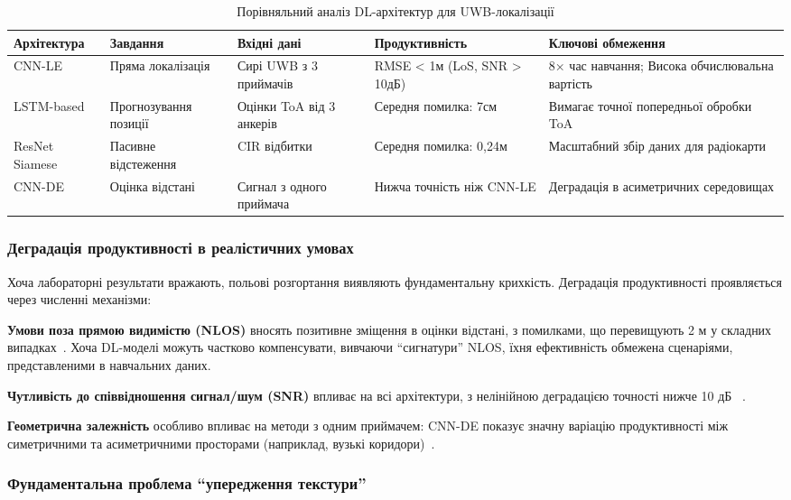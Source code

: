 \documentclass[12pt,a4paper]{article}
\begin{document}
\begin{table}[h]
	\centering
	\caption{Порівняльний аналіз DL-архітектур для UWB-локалізації}
	\label{tab:dl_architectures}
	\begin{tabular}{@{}p{2.5cm}p{2.5cm}p{3cm}p{3cm}p{3.5cm}@{}}
		\toprule
		\textbf{Архітектура} & \textbf{Завдання} & \textbf{Вхідні дані} & \textbf{Продуктивність} & \textbf{Ключові обмеження} \\
		\midrule
		CNN-LE & Пряма локалізація & Сирі UWB з 3 приймачів & RMSE < 1м (LoS, SNR > 10дБ) & 8× час навчання; Висока обчислювальна вартість \\
		LSTM-based & Прогнозування позиції & Оцінки ToA від 3 анкерів & Середня помилка: 7см & Вимагає точної попередньої обробки ToA \\
		ResNet Siamese & Пасивне відстеження & CIR відбитки & Середня помилка: 0,24м & Масштабний збір даних для радіокарти \\
		CNN-DE & Оцінка відстані & Сигнал з одного приймача & Нижча точність ніж CNN-LE & Деградація в асиметричних середовищах \\
		\bottomrule
	\end{tabular}
\end{table}

\subsubsection{Деградація продуктивності в реалістичних умовах}

Хоча лабораторні результати вражають, польові розгортання виявляють фундаментальну крихкість. Деградація продуктивності проявляється через численні механізми:

\textbf{Умови поза прямою видимістю (NLOS)} вносять позитивне зміщення в оцінки відстані, з помилками, що перевищують 2 м у складних випадках~\cite{gezici2005localization}. Хоча DL-моделі можуть частково компенсувати, вивчаючи ``сигнатури'' NLOS, їхня ефективність обмежена сценаріями, представленими в навчальних даних.

\textbf{Чутливість до співвідношення сигнал/шум (SNR)} впливає на всі архітектури, з нелінійною деградацією точності нижче 10 дБ ~\cite{cnn_le_2020}.

 \textbf{Геометрична залежність} особливо впливає на методи з одним приймачем: CNN-DE показує значну варіацію продуктивності між симетричними та асиметричними просторами (наприклад, вузькі коридори)~\cite{cnn_le_2020}.

\subsubsection{Фундаментальна проблема ``упередження текстури''}
\end{document}

